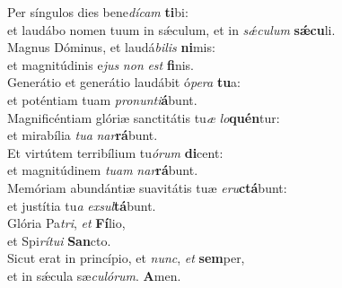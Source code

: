 \evenverse Per síngulos dies bene\textit{dí}\textit{cam} \textbf{ti}bi:~\*\\
\evenverse et laudábo nomen tuum in sǽculum, et in \textit{sǽ}\textit{cu}\textit{lum} \textbf{sǽ}\textbf{cu}li.\\
\oddverse Magnus Dóminus, et laudá\textit{bi}\textit{lis} \textbf{ni}mis:~\*\\
\oddverse et magnitúdinis e\textit{jus} \textit{non} \textit{est} \textbf{fi}nis.\\
\evenverse Generátio et generátio laudábit ó\textit{pe}\textit{ra} \textbf{tu}a:~\*\\
\evenverse et poténtiam tuam \textit{pro}\textit{nun}\textit{ti}\textbf{á}bunt.\\
\oddverse Magnificéntiam glóriæ sanctitátis tu\textit{æ} \textit{lo}\textbf{quén}tur:~\*\\
\oddverse et mirabília \textit{tu}\textit{a} \textit{nar}\textbf{rá}bunt.\\
\evenverse Et virtútem terribílium tu\textit{ó}\textit{rum} \textbf{di}cent:~\*\\
\evenverse et magnitúdinem \textit{tu}\textit{am} \textit{nar}\textbf{rá}bunt.\\
\oddverse Memóriam abundántiæ suavitátis tuæ \textit{e}\textit{ru}\textbf{ctá}bunt:~\*\\
\oddverse et justítia tu\textit{a} \textit{ex}\textit{sul}\textbf{tá}bunt.\\
\evenverse Glória Pa\textit{tri}, \textit{et} \textbf{Fí}lio,~\*\\
\evenverse et Spi\textit{rí}\textit{tu}\textit{i} \textbf{San}cto.\\
\oddverse Sicut erat in princípio, et \textit{nunc}, \textit{et} \textbf{sem}per,~\*\\
\oddverse et in sǽcula sæ\textit{cu}\textit{ló}\textit{rum}. \textbf{A}men.\\
